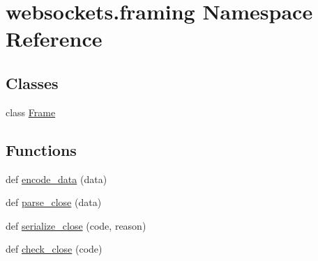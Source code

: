 \hypertarget{namespacewebsockets_1_1framing}{}\section{websockets.\+framing Namespace Reference}
\label{namespacewebsockets_1_1framing}
\subsection*{Classes}
\begin{DoxyCompactItemize}
\item 
class \hyperlink{classwebsockets_1_1framing_1_1_frame}{Frame}
\end{DoxyCompactItemize}
\subsection*{Functions}
\begin{DoxyCompactItemize}
\item 
def \hyperlink{namespacewebsockets_1_1framing_a2b818e33b862ae9d6aba510f28ff3054}{encode\+\_\+data} (data)
\item 
def \hyperlink{namespacewebsockets_1_1framing_a87c07ac57ab91606a4b370928bdd9661}{parse\+\_\+close} (data)
\item 
def \hyperlink{namespacewebsockets_1_1framing_a66d055e10d1ee6fee90af85bb16bd3e0}{serialize\+\_\+close} (code, reason)
\item 
def \hyperlink{namespacewebsockets_1_1framing_a9188aa9c6668705e1177726998a42b3e}{check\+\_\+close} (code)
\end{DoxyCompactItemize}
